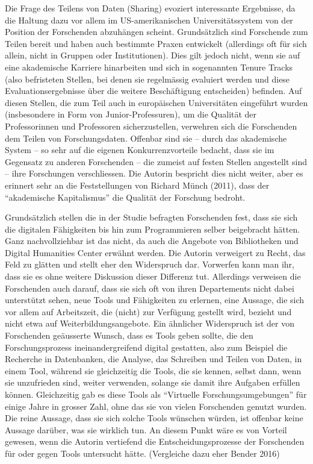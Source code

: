 \documentclass[a4paper,
fontsize=11pt,
oneside,
numbers=noperiodatend,
parskip=half-,
bibliography=totoc,
final
]{scrartcl}
\begin{document}
Die Frage des Teilens von Daten (Sharing) evoziert interessante
Ergebnisse, da die Haltung dazu vor allem im US-amerikanischen
Universitätssystem von der Position der Forschenden abzuhängen scheint.
Grundsätzlich sind Forschende zum Teilen bereit und haben auch bestimmte
Praxen entwickelt (allerdings oft für sich allein, nicht in Gruppen oder
Institutionen). Dies gilt jedoch nicht, wenn sie auf eine akademische
Karriere hinarbeiten und sich in sogenannten Tenure Tracks (also
befristeten Stellen, bei denen sie regelmässig evaluiert werden und
diese Evaluationsergebnisse über die weitere Beschäftigung entscheiden)
befinden. Auf diesen Stellen, die zum Teil auch in europäischen
Universitäten eingeführt wurden (insbesondere in Form von
Junior-Professuren), um die Qualität der Professorinnen und Professoren
sicherzustellen, verwehren sich die Forschenden dem Teilen von
Forschungsdaten. Offenbar sind sie -- durch das akademische System -- so
sehr auf die eigenen Konkurrenzvorteile bedacht, dass sie im Gegensatz
zu anderen Forschenden -- die zumeist auf festen Stellen angestellt sind
-- ihre Forschungen verschliessen. Die Autorin bespricht dies nicht
weiter, aber es erinnert sehr an die Feststellungen von Richard Münch
(2011), dass der \enquote{akademische Kapitalismus} die Qualität der
Forschung bedroht.

Grundsätzlich stellen die in der Studie befragten Forschenden fest, dass
sie sich die digitalen Fähigkeiten bis hin zum Programmieren selber
beigebracht hätten. Ganz nachvollziehbar ist das nicht, da auch die
Angebote von Bibliotheken und Digital Humanities Center erwähnt werden.
Die Autorin verweigert zu Recht, das Feld zu glätten und stellt eher den
Widerspruch dar. Vorwerfen kann man ihr, dass sie es ohne weitere
Diskussion dieser Differenz tut. Allerdings verweisen die Forschenden
auch darauf, dass sie sich oft von ihren Departements nicht dabei
unterstützt sehen, neue Tools und Fähigkeiten zu erlernen, eine Aussage,
die sich vor allem auf Arbeitszeit, die (nicht) zur Verfügung gestellt
wird, bezieht und nicht etwa auf Weiterbildungsangebote. Ein ähnlicher
Widerspruch ist der von Forschenden geäusserte Wunsch, dass es Tools
geben sollte, die den Forschungsprozess ineinandergreifend digital
gestatten, also zum Beispiel die Recherche in Datenbanken, die Analyse,
das Schreiben und Teilen von Daten, in einem Tool, während sie
gleichzeitig die Tools, die sie kennen, selbst dann, wenn sie
unzufrieden sind, weiter verwenden, solange sie damit ihre Aufgaben
erfüllen können. Gleichzeitig gab es diese Tools als \enquote{Virtuelle
Forschungsumgebungen} für einige Jahre in grosser Zahl, ohne das sie von
vielen Forschenden genutzt wurden. Die reine Aussage, dass sie sich
solche Tools wünschen würden, ist offenbar keine Aussage darüber, was
sie wirklich tun. An diesem Punkt wäre es von Vorteil gewesen, wenn die
Autorin vertiefend die Entscheidungsprozesse der Forschenden für oder
gegen Tools untersucht hätte. (Vergleiche dazu eher Bender 2016)
\end{document}
